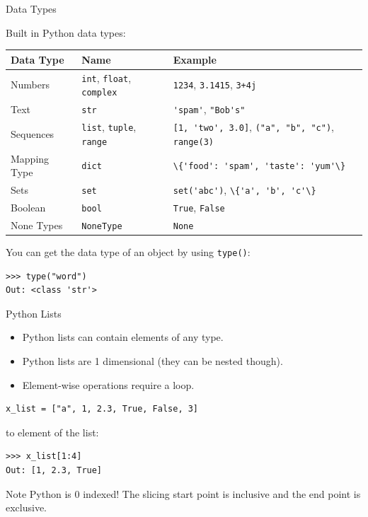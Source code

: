 \documentclass[compress%
,aspectratio=169%
]{beamer}
\newcommand{\code}{\lstinline}
\begin{document}
\begin{frame}[fragile]{Data Types}

Built in Python data types:
\begin{table}
\tiny
\setlength\fboxsep{1.5pt} %
\begin{tabularx}{\textwidth}{llX}
    \toprule
    \textbf{Data Type}  & \textbf{Name}  & \textbf{Example}   \\
    \midrule
    Numbers         &  \code|int|,  \code|float|,  \code|complex| & \code|1234|, \code|3.1415|, \code|3+4j| \\
    Text            &  \code|str|      & \code|'spam'|, \code|"Bob's"|    \\
    Sequences       &  \code|list|,  \code|tuple|,  \code|range|  & \code|[1, 'two', 3.0]|,  \code|("a", "b", "c")|,  \code|range(3)| \\
    Mapping Type    &  \code|dict|     & \code|\{'food': 'spam', 'taste': 'yum'\}|  \\
    Sets            &  \code|set|      & \code|set('abc')|, \code|\{'a', 'b', 'c'\}| \\           
    Boolean         &  \code|bool|     & \code|True|, \code|False|  \\
    None Types      & \code|NoneType|  & \code|None| \\
    \bottomrule
\end{tabularx}
\end{table}

You can get the data type of an object by using \lstinline|type()|:
\begin{lstlisting}
>>> type("word")
Out: <class 'str'>
\end{lstlisting}

\end{frame}


\begin{frame}[fragile]{Python Lists}

\begin{itemize}
    \item Python lists can contain elements of any type.
    \item Python lists are 1 dimensional (they can be nested though).
    \item Element-wise operations require a loop.
\end{itemize}
\begin{lstlisting}
x_list = ["a", 1, 2.3, True, False, 3]
\end{lstlisting}
 to  element of the list:
\begin{lstlisting}
>>> x_list[1:4]
Out: [1, 2.3, True]
\end{lstlisting}
\begin{alertblock}{Note}
Python is 0 indexed! The slicing start point is inclusive and the end point is exclusive.
\end{alertblock}
\end{frame}
\end{document}
